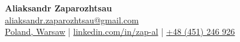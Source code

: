\documentclass[10pt,a4paper]{article}
\newcommand{\linkedin}[1]{\href{https://linkedin.com/#1}{linkedin.com/in/#1}}
\newcommand{\email}[1]{\href{mailto:#1}{#1}}
\begin{document}
\begin{center}
  \huge\textbf{Aliaksandr Zaparozhtsau}\\
  \normalsize
  \email{aliaksandr.zaparozhtsau@gmail.com}\\
  \href{Poland, Warsaw}{Poland, Warsaw}
  | \linkedin{zap-al}
  | \href{tel:48451246926}{+48 (451) 246 926}\\
\end{center}



\hfill



\hfill



\hfill


\end{document}
